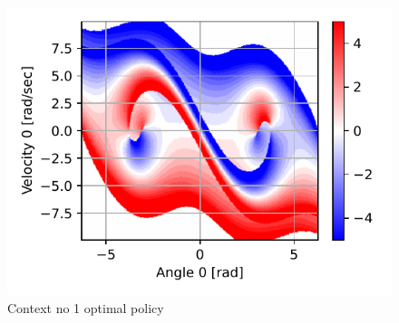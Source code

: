 










\begin{figure}[p]
\begin{center}
\includegraphics[width=0.99\linewidth]{fig/c1_policy.pdf}
\caption{Context no 1 optimal policy}\label{fig:c1_policy}
\end{center}
\end{figure}



